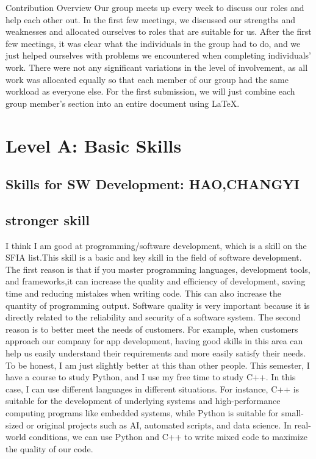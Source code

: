 \documentclass[a4paper, 11pt]{report}
\begin{document}
Contribution Overview
Our group meets up every week to discuss our roles and help each other out. In the first few meetings, we discussed our strengths and weaknesses and allocated ourselves to roles that are suitable for us. After the first few meetings, it was clear what the individuals in the group had to do, and we just helped ourselves with problems we encountered when completing individuals’ work. There were not any significant variations in the level of involvement, as all work was allocated equally so that each member of our group had the same workload as everyone else. For the first submission, we will just combine each group member's section into an entire document using LaTeX.


\newpage
\section{Level A: Basic Skills}
\subsection{Skills for SW Development: HAO,CHANGYI}
\subsection{stronger skill}
	I think I am good at programming/software development, which is a skill on the SFIA list.This skill is a basic and key skill in the field of software development.
The first reason is that if you master programming languages, development tools, and frameworks,it can increase the quality and efficiency of development, saving time and reducing mistakes when writing code. This can also increase the quantity of programming output. Software quality is very important because it is directly related to the reliability and security of a software system.
	The second reason is to better meet the needs of customers. For example, when customers approach our company for app development, having good skills in this area can help us easily understand their requirements and more easily satisfy their needs.
To be honest, I am just slightly better at this than other people. This semester, I have a course to study Python, and I use my free time to study C++. In this case, I can use different languages in different situations. For instance, C++ is suitable for the development of underlying systems and high-performance computing programs like embedded systems, while Python is suitable for small-sized or original projects such as AI, automated scripts, and data science. In real-world conditions, we can use Python and C++ to write mixed code to maximize the quality of our code.
\end{document}
